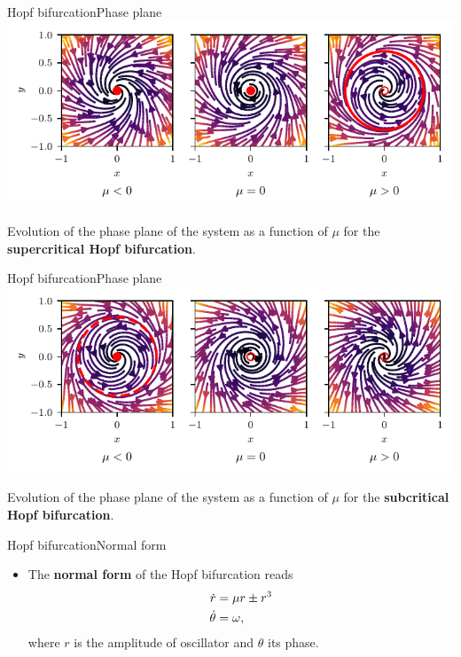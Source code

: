 \documentclass[usenames,dvipsnames,svgnames,10pt,aspectratio=169]{beamer}
\begin{document}
\begin{frame}[t, c]{Hopf bifurcation}{Phase plane}
	\centering
	\includegraphics[width=.75\textwidth]{supercritical_hopf_bifurcation_phase_plane}

	Evolution of the phase plane of the system as a function of $\mu$ for the \alert{\textbf{supercritical Hopf bifurcation}}.

	\vspace{1cm}
\end{frame}


\begin{frame}[t, c]{Hopf bifurcation}{Phase plane}
	\centering
	\includegraphics[width=.75\textwidth]{subcritical_hopf_bifurcation_phase_plane}

	Evolution of the phase plane of the system as a function of $\mu$ for the \alert{\textbf{subcritical Hopf bifurcation}}.

	\vspace{1cm}
\end{frame}

\begin{frame}[t, c]{Hopf bifurcation}{Normal form}
	\begin{itemize}
		\item The \alert{\textbf{normal form}} of the Hopf bifurcation reads
		\begin{equation}
			\begin{aligned}
				\dot{r} & = \mu r \pm r^3 \\
				\dot{\theta} & = \omega,
			\end{aligned}
			\notag
		\end{equation}
		where $r$ is the amplitude of oscillator and $\theta$ its phase.
	\end{itemize}

	\vspace{1cm}
\end{frame}
\end{document}
